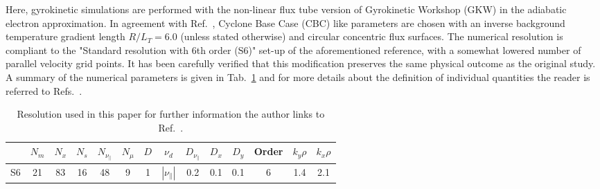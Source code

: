\documentclass[aip, amsmath, amssymb, reprint, twocolumn]{revtex4-1}
\begin{document}
Here, gyrokinetic simulations are performed with the non-linear flux tube version of Gyrokinetic Workshop (GKW) \cite{peeters2009} in the adiabatic electron approximation.
In agreement with Ref.~\cite{peeters2016}, Cyclone Base Case (CBC) like parameters are chosen with an inverse background temperature gradient length $R/L_T = 6.0$ (unless stated otherwise) and circular concentric flux surfaces. 
The numerical resolution is compliant to the "Standard resolution with 6th order (S6)" set-up of the aforementioned reference, with a somewhat lowered number of parallel velocity grid points.
It has been carefully verified that this modification preserves the same physical outcome as the original study.
A summary of the numerical parameters is given in Tab.~\ref{tab:resolution} and for more details about the definition of individual quantities the reader is referred to Refs.~\cite{peeters2009, peeters2016}.
\begin{table}[ht]
	\begin{ruledtabular}
		\begin{tabular}{l | ccccc | ccccc | c | cc}
			& $N_m$ & $N_x$ & $N_s$ & $N_{\nu_\parallel}$ & $N_\mu$ & $D$ & $\nu_d$           & $D_{\nu_\parallel}$ & $D_x$ & $D_y$ & Order & $k_y\rho$ & $k_x\rho$ \\
			\hline
			S6   & 21    & 83    & 16    & 48                  & 9       & 1   & $|\nu_\parallel|$ & 0.2                 & 0.1   & 0.1   & 6     & 1.4       & 2.1       \\
		\end{tabular}
	\end{ruledtabular}
	\caption{
		Resolution used in this paper for further information the author links to Ref.~\cite{peeters2016}. %
	}
	\label{tab:resolution}
\end{table}\bigskip
  
\end{document}
